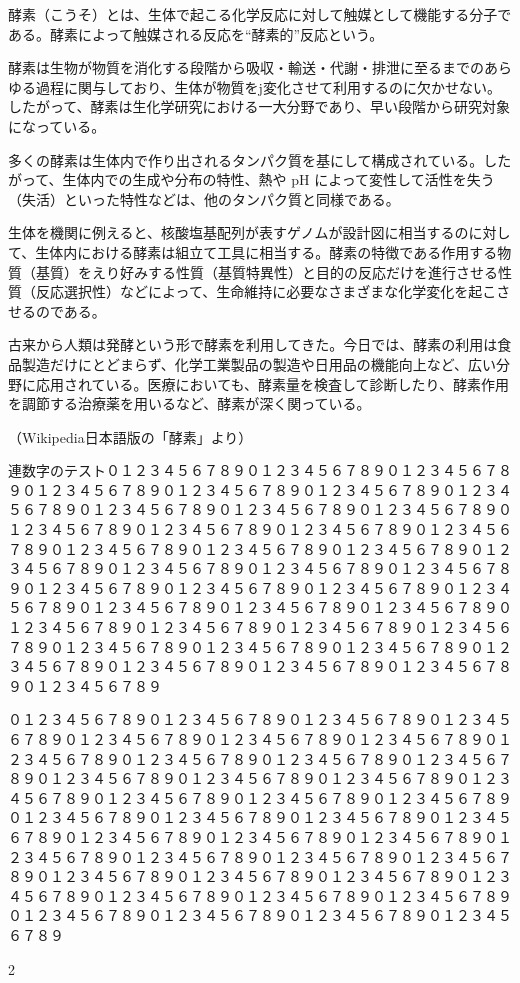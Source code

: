 \documentclass{ltjtarticle}
\begin{document}
酵素（こうそ）とは、生体で起こる化学反応に対して触媒として機能する分子である。酵素によって触媒される反応を“酵素的”反応という。

酵素は生物が物質を消化する段階から吸収・輸送・代謝・排泄に至るまでのあらゆる過程に関与しており、生体が物質をj変化させて利用するのに欠かせない。したがって、酵素は生化学研究における一大分野であり、早い段階から研究対象になっている。

多くの酵素は生体内で作り出されるタンパク質を基にして構成されている。したがって、生体内での生成や分布の特性、熱や pH によって変性して活性を失う（失活）といった特性などは、他のタンパク質と同様である。

生体を機関に例えると、核酸塩基配列が表すゲノムが設計図に相当するのに対して、生体内における酵素は組立て工具に相当する。酵素の特徴である作用する物質（基質）をえり好みする性質（基質特異性）と目的の反応だけを進行させる性質（反応選択性）などによって、生命維持に必要なさまざまな化学変化を起こさせるのである。

古来から人類は発酵という形で酵素を利用してきた。今日では、酵素の利用は食品製造だけにとどまらず、化学工業製品の製造や日用品の機能向上など、広い分野に応用されている。医療においても、酵素量を検査して診断したり、酵素作用を調節する治療薬を用いるなど、酵素が深く関っている。

\begin{flushright}
（Wikipedia日本語版の「酵素」より）
\end{flushright}

\def\R{０１２３４５６７８９０１２３４５６７８９}
\def\S{\R\R\R\R\R\R\R\R\R\R\R\R\R\R\R\R\R\R\R\R\par}

連数字のテスト\S\S
\leavevmode \leaders\hbox{2}\hskip2pt
\end{document}
